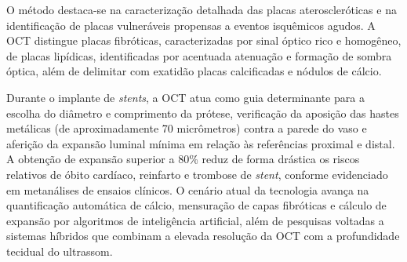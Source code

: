 \documentclass[a4paper,12pt,oneside,openright]{abntex2}
\begin{document}
O método destaca-se na caracterização detalhada das placas ateroscleróticas e na identificação de placas vulneráveis propensas a eventos isquêmicos agudos. A OCT distingue placas fibróticas, caracterizadas por sinal óptico rico e homogêneo, de placas lipídicas, identificadas por acentuada atenuação e formação de sombra óptica, além de delimitar com exatidão placas calcificadas e nódulos de cálcio. 

Durante o implante de \textit{stents}, a OCT atua como guia determinante para a escolha do diâmetro e comprimento da prótese, verificação da aposição das hastes metálicas (de aproximadamente 70 micrômetros) contra a parede do vaso e aferição da expansão luminal mínima em relação às referências proximal e distal. A obtenção de expansão superior a 80\% reduz de forma drástica os riscos relativos de óbito cardíaco, reinfarto e trombose de \textit{stent}, conforme evidenciado em metanálises de ensaios clínicos. O cenário atual da tecnologia avança na quantificação automática de cálcio, mensuração de capas fibróticas e cálculo de expansão por algoritmos de inteligência artificial, além de pesquisas voltadas a sistemas híbridos que combinam a elevada resolução da OCT com a profundidade tecidual do ultrassom.
\end{document}
